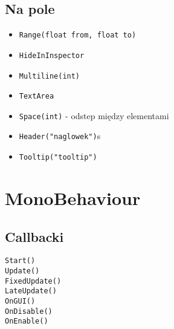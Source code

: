 \documentclass{article}
\begin{document}
\subsection{Na pole}
\begin{itemize}
    \item \verb`Range(float from, float to)`
    \item \verb`HideInInspector`
    \item \verb`Multiline(int)`
    \item \verb`TextArea`
    \item \verb`Space(int)` - odstep między elementami
    \item \verb`Header("naglowek")`s
    \item \verb`Tooltip("tooltip")`
\end{itemize}

\section{MonoBehaviour}

\subsection{Callbacki}
\begin{lstlisting}
Start()
Update()
FixedUpdate()
LateUpdate()
OnGUI()
OnDisable()
OnEnable()

\end{lstlisting}
\end{document}
